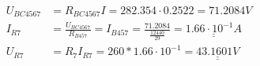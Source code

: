 \begin{figure}[H]
\begin{equation*}
\begin{aligned}
      U_{BC4567} & = R_{BC4567} I = 282.354 \cdot 0.2522 = 71.2084 V                                                                                                      \\
      I_{R7}     & = \frac{U_{BC4567}}{R_{B457}} = I_{B457} = \frac{71.2084}{\frac{12440}{29}} = \underline{\underline{1.66 \cdot 10^{-1} A}}                             \\
      U_{R7}     & = R_7 I_{R7} = 260 * 1.66 \cdot 10^{-1} = \underline{\underline{43.1601 V}}
    \end{aligned}
  \end{equation*}
\end{figure}
